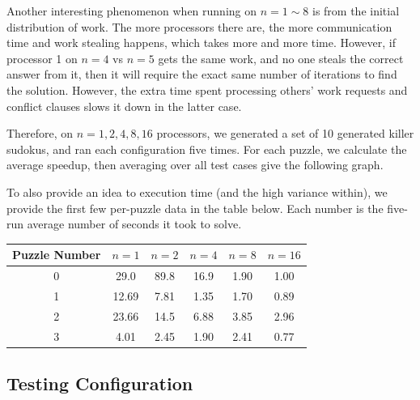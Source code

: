 \documentclass{article}
\begin{document}
Another interesting phenomenon when running on $n=1\sim8$ is from the initial distribution of work.
The more processors there are, the more communication time and work stealing happens, which takes more and more time.
However, if processor 1 on $n=4$ vs $n=5$ gets the same work, and no one steals the correct answer from it, then it will require the exact same number of iterations to find the solution.
However, the extra time spent processing others' work requests and conflict clauses slows it down in the latter case.

Therefore, on $n=1,2,4,8,16$ processors, we generated a set of 10 generated killer sudokus, and ran each configuration five times.
For each puzzle, we calculate the average speedup, then averaging over all test cases give the following graph.


To also provide an idea to execution time (and the high variance within), we provide the first few per-puzzle data in the table below.
Each number is the five-run average number of seconds it took to solve.

\vspace{12pt}
\begin{tabular}{c|ccccc}
    \hline
    Puzzle Number & $n=1$ & $n=2$ & $n=4$ & $n=8$ & $n=16$ \\
    \hline
    0 & 29.0 & 89.8 & 16.9 & 1.90 & 1.00\\
    1 & 12.69 & 7.81 & 1.35 & 1.70 & 0.89\\
    2 & 23.66 & 14.5 & 6.88 & 3.85 & 2.96\\
    3 & 4.01 & 2.45 & 1.90 & 2.41 & 0.77
\end{tabular}
\label{tab:data}
\vspace{12pt}

\subsection{Testing Configuration}
\end{document}
